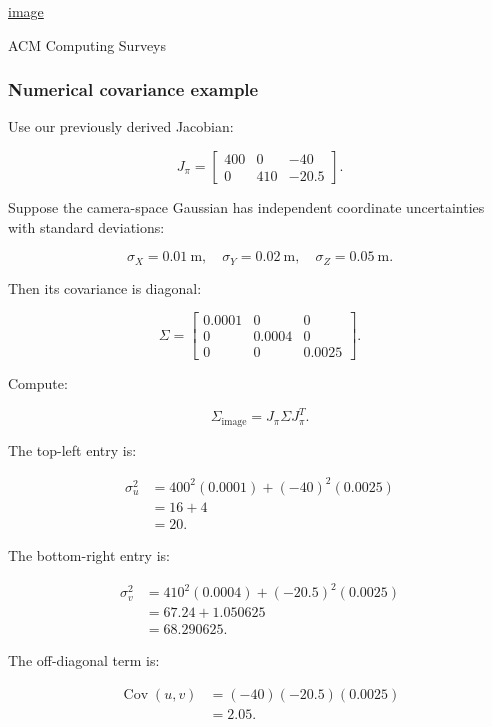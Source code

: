 \href{https://www.google.com/s2/favicons?domain=https://doi.org&sz=32}{image}

ACM Computing Surveys

\subsubsection{Numerical covariance example}\label{02-foundations-ii-ch021-numerical-covariance-example}

\hypertarget{02-foundations-ii-ch021-numerical-covariance-example}{}

Use our previously derived Jacobian:

\[
J_\pi= \begin{bmatrix} 400&0&-40\\ 0&410&-20.5 \end{bmatrix}.
\]

Suppose the camera-space Gaussian has independent coordinate uncertainties with standard deviations:

\[
\sigma_X=0.01\ \mathrm m,\quad \sigma_Y=0.02\ \mathrm m,\quad \sigma_Z=0.05\ \mathrm m.
\]

Then its covariance is diagonal:

\[
\Sigma= \begin{bmatrix} 0.0001&0&0\\ 0&0.0004&0\\ 0&0&0.0025 \end{bmatrix}.
\]

Compute:

\[
\Sigma_{\text{image}}=J_\pi\Sigma J_\pi^T.
\]

The top-left entry is:

\[
\begin{aligned} \sigma_u^2 &=400^2(0.0001)+(-40)^2(0.0025)\\ &=16+4\\ &=\boxed{20}. \end{aligned}
\]

The bottom-right entry is:

\[
\begin{aligned} \sigma_v^2 &=410^2(0.0004)+(-20.5)^2(0.0025)\\ &=67.24+1.050625\\ &=\boxed{68.290625}. \end{aligned}
\]

The off-diagonal term is:

\[
\begin{aligned} \operatorname{Cov}(u,v) &=(-40)(-20.5)(0.0025)\\ &=\boxed{2.05}. \end{aligned}
\]


